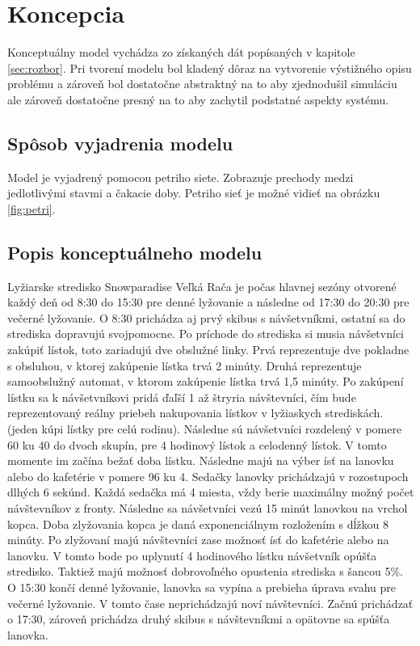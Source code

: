 \section{Koncepcia}
Konceptuálny model\cite[str. 13]{ims} vychádza zo získaných dát popísaných v kapitole \ref{sec:rozbor}. Pri tvorení modelu bol kladený dôraz
na vytvorenie výstižného opisu problému a zároveň bol dostatočne abstraktný na to aby zjednodušil simuláciu ale zároveň dostatočne presný na to aby zachytil podstatné aspekty systému. 

\subsection{Spôsob vyjadrenia modelu}
Model je vyjadrený pomocou petriho siete. Zobrazuje prechody medzi jedlotlivými stavmi a čakacie doby. Petriho sieť je možné vidieť na obrázku \ref{fig:petri}.

\subsection{Popis konceptuálneho modelu}
Lyžiarske stredisko Snowparadise Veľká Rača je počas hlavnej sezóny otvorené každý deň od 8:30 do 15:30 pre denné lyžovanie a následne 
od 17:30 do 20:30 pre večerné lyžovanie. O 8:30 prichádza aj prvý skibus s návšetvníkmi, ostatní sa do strediska dopravujú svojpomocne. Po príchode do strediska si musia návšetvníci zakúpiť lístok, toto zariadujú dve obslužné linky. 
Prvá reprezentuje dve pokladne s obsluhou,
v ktorej zakúpenie lístka trvá 2 minúty. Druhá reprezentuje samoobslužný automat, v ktorom zakúpenie lístka trvá 1,5 minúty.
Po zakúpení lístku sa k návšetvníkovi pridá ďaľší 1 až štryria návštevníci, čím bude reprezentovaný reálny priebeh nakupovania lístkov v lyžiaskych strediskách.
(jeden kúpi lístky pre celú rodinu). Následne sú návšetvníci rozdelený v pomere 60 ku 40 do dvoch skupín, pre 4 hodinový lístok a celodenný lístok.
V tomto momente im začína bežať doba lístku. Následne majú na výber ísť na lanovku alebo do kafetérie v pomere 96 ku 4. Sedačky lanovky 
prichádzajú v rozostupoch dlhých 6 sekúnd. Každá sedačka má 4 miesta, vždy berie maximálny možný počet návštevníkov z fronty. Následne
sa návšetvníci vezú 15 minút lanovkou na vrchol kopca. Doba zlyžovania kopca je daná exponenciálnym rozložením s dĺžkou 8 minúty.
Po zlyžovaní majú návštevníci zase možnosť ísť do kafetérie alebo na lanovku. V tomto bode po uplynutí 4 hodinového lístku návšetvník opúšťa stredisko. Taktiež majú možnosť dobrovoľného opustenia strediska s šancou 5\%.
O 15:30 končí denné lyžovanie, lanovka sa vypína a prebieha úprava svahu pre večerné lyžovanie. V tomto čase neprichádzajú noví návštevníci.
Začnú prichádzať o 17:30, zároveň prichádza druhý skibus s návštevníkmi a opätovne sa spúšťa lanovka. 

